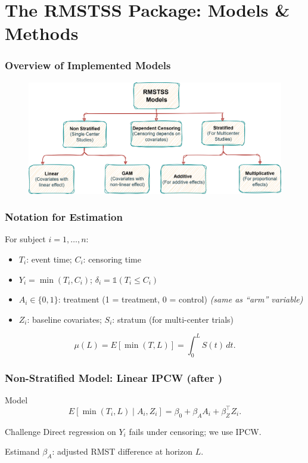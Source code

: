 \documentclass{beamer}
\begin{document}
\section{The RMSTSS Package: Models \& Methods}
\begin{frame}
\frametitle{Overview of Implemented Models}
\begin{figure}
    \centering
    \includegraphics[width=\linewidth]{images/app-models.png}
\end{figure}
\end{frame}

\begin{frame}
\frametitle{Notation for Estimation}
For subject $i=1,\dots,n$:
\begin{itemize}
  \item $T_i$: event time; $C_i$: censoring time
  \item $Y_i = \min(T_i, C_i)$; \; $\delta_i = \mathbb{1}(T_i \le C_i)$
  \item $A_i \in \{0,1\}$: treatment (1 = treatment, 0 = control) \textit{(same as ``arm'' variable)}
  \item $Z_i$: baseline covariates; \; $S_i$: stratum (for multi-center trials)
\end{itemize}
\[
\mu(L) = E[\min(T,L)] = \int_0^L S(t)\,dt.
\]
\end{frame}

\begin{frame}
\frametitle{Non-Stratified Model: Linear IPCW (after \cite{tian2014})}
\begin{block}{Model}
\[
E[\min(T_i,L) \mid A_i, Z_i] = \beta_0 + \beta_A A_i + \beta_Z^\top Z_i.
\]
\end{block}
\begin{block}{Challenge}
Direct regression on $Y_i$ fails under censoring; we use IPCW.
\end{block}
\begin{block}{Estimand}
$\beta_A$: adjusted RMST difference at horizon $L$.
\end{block}
\end{frame}
\end{document}
